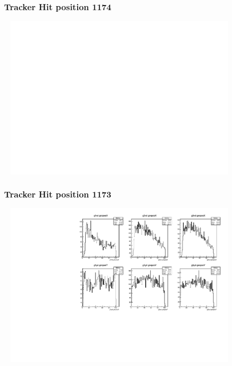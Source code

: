 \documentclass[slidestop,compress,mathserif]{beamer}
\begin{document}
\begin{frame}\frametitle{Tracker Hit position 1174}
	 \includegraphics[width=12cm,height=8cm]{Tracker_Hit_position_1174.pdf}
\end{frame}
\begin{frame}\frametitle{Tracker Hit position 1173}
	 \includegraphics[width=12cm,height=8cm]{Tracker_Hit_position_1173.pdf}
\end{frame}
\end{document}
